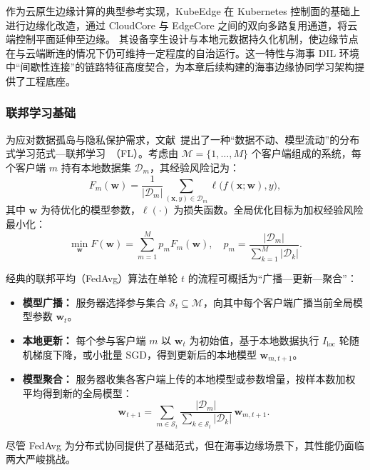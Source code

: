 作为云原生边缘计算的典型参考实现，KubeEdge 在 Kubernetes 控制面的基础上进行边缘化改造，通过 CloudCore 与 EdgeCore 之间的双向多路复用通道，将云端控制平面延伸至边缘。 其设备孪生设计与本地元数据持久化机制，使边缘节点在与云端断连的情况下仍可维持一定程度的自治运行。这一特性与海事 DIL 环境中“间歇性连接”的链路特征高度契合，为本章后续构建的海事边缘协同学习架构提供了工程底座。

\subsubsection{联邦学习基础}
为应对数据孤岛与隐私保护需求，文献~\cite{mcmahan2017fedavg}提出了一种“数据不动、模型流动”的分布式学习范式—联邦学习~（FL）。考虑由 $\mathcal{M}=\{1,\ldots,M\}$ 个客户端组成的系统，每个客户端 $m$ 持有本地数据集 $\mathcal{D}_m$，其经验风险记为：
\begin{equation}
	F_m(\mathbf{w}) = \frac{1}{|\mathcal{D}_m|}\sum_{(\mathbf{x},y)\in\mathcal{D}_m}
	\ell\big(f(\mathbf{x};\mathbf{w}),y\big),
\end{equation}
其中 $\mathbf{w}$ 为待优化的模型参数，$\ell(\cdot)$ 为损失函数。全局优化目标为加权经验风险最小化：
\begin{equation}
	\min_{\mathbf{w}} F(\mathbf{w}) = \sum_{m=1}^{M}p_m F_m(\mathbf{w}), \quad
	p_m = \frac{|\mathcal{D}_m|}{\sum_{k=1}^{M}|\mathcal{D}_k|}.
	\label{eq:fl_global_objective}
\end{equation}

经典的联邦平均（FedAvg）算法在单轮 $t$ 的流程可概括为“广播—更新—聚合”：
\begin{itemize}
	\item \textbf{模型广播：} 服务器选择参与集合 $\mathcal{S}_t\subseteq\mathcal{M}$，向其中每个客户端广播当前全局模型参数 $\mathbf{w}_t$。
	\item \textbf{本地更新：} 每个参与客户端 $m$ 以 $\mathbf{w}_t$ 为初始值，基于本地数据执行 $I_{\text{loc}}$ 轮随机梯度下降，或小批量 SGD，得到更新后的本地模型 $\mathbf{w}_{m,t+1}$。
	\item \textbf{模型聚合：} 服务器收集各客户端上传的本地模型或参数增量，按样本数加权平均得到新的全局模型：
	\begin{equation}
		\mathbf{w}_{t+1} = \sum_{m\in\mathcal{S}_t}\frac{|\mathcal{D}_m|}{\sum_{k\in\mathcal{S}_t}|\mathcal{D}_k|}\,\mathbf{w}_{m,t+1}.
		\label{eq:fedavg_aggregation}
	\end{equation}
\end{itemize}

尽管 FedAvg 为分布式协同提供了基础范式，但在海事边缘场景下，其性能仍面临两大严峻挑战。

